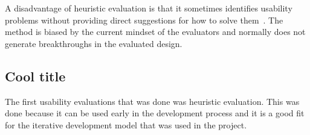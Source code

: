 A disadvantage of heuristic evaluation is that it sometimes identifies usability problems without providing direct suggestions for how to solve them~\cite{Nielsen1990}. The method is biased by the current mindset of the evaluators and normally does not generate breakthroughs in the evaluated design.

\subsection{Cool title}
The first usability evaluations that was done was heuristic evaluation. This was done because it can be used early in the development process and it is a good fit for the iterative development model that was used in the project.
